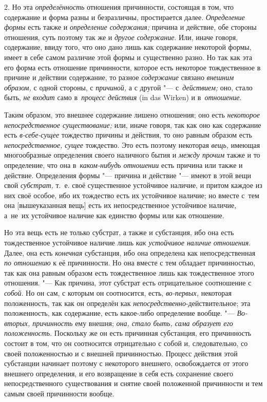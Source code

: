2. Но эта {\em определённость} отношения причинности, состоящая в том, что
содержание и форма разны и безразличны, простирается далее. {\em Определение
формы} есть также и {\em определение содержания;} причина и действие, обе
стороны отношения, суть поэтому так же и {\em другое содержание}. Или, иначе
говоря, содержание, ввиду того, что оно дано лишь как содержание некоторой
формы, имеет в себе самом различие этой формы и существенно разно. Но так как
эта его форма есть отношение причинности, которое есть некоторое тождественное
в причине и действии содержание, то разное {\em содержание} связано
{\em внешним образом,} с одной стороны, с {\em причиной,} а с другой "---
с~{\em действием;} оно, стало быть, {\em не входит} само
в~{\em процесс действия} (in das Wir\-ken) и в~{\em отношение}.

Таким образом, это внешнее содержание лишено отношения; оно есть
{\em некоторое непосредственное существование;} или, иначе говоря, так как оно
как содержание есть {\em в-себе-сущее} тождество причины и действия, то оно
равным образом есть {\em непосредственное, сущее} тождество. Это есть поэтому
некоторая {\em вещь,} имеющая многообразные определения своего наличного бытия
и {\em между прочим} также и то определение, что она
в~{\em каком-нибудь отношении} есть причина или также и действие. Определения
формы "--- причина и действие "--- имеют в этой вещи свой {\em субстрат,} т.~е.
своё существенное устойчивое наличие, и притом каждое из них своё особое, ибо
их тождество есть их устойчивое наличие; но вместе с~тем она
[вышеуказанная вещь] есть их непосредственное устойчивое наличие,
а~не~их устойчивое наличие как единство формы или как отношение.

Но эта вещь есть не только субстрат, а также и субстанция, ибо она есть
тождественное устойчивое наличие лишь {\em как устойчивое наличие отношения}.
Далее, она есть {\em конечная} субстанция, ибо она определена как
непосредственная {\em по отношению} к её причинности. Но она вместе с тем
обладает причинностью, так как она равным образом есть тождественное лишь как
тождественное этого отношения. "--- Как причина, этот субстрат есть
отрицательное соотношение с {\em собой}. Но он сам, с которым он соотносится,
есть, {\em во-первых,} некоторая положенность, так как он определён как
{\em непосредственно}-действительное; эта положенность, как содержание, есть
какое-либо определение вообще. "--- {\em Во-вторых, причинность} ему
внешня; {\em она, стало быть, сама образует его положенность}. Поскольку же он
есть причинная субстанция, его причинность состоит в том, что он соотносится
отрицательно с собой и, следовательно, со своей положенностью и с внешней
причинностью. Процесс действия этой субстанции начинает поэтому с некоторого
внешнего, освобождается от этого внешнего определения, и его возвращение в себя
есть сохранение своего непосредственного существования и снятие своей
положенной причинности и тем самым своей причинности вообще.


